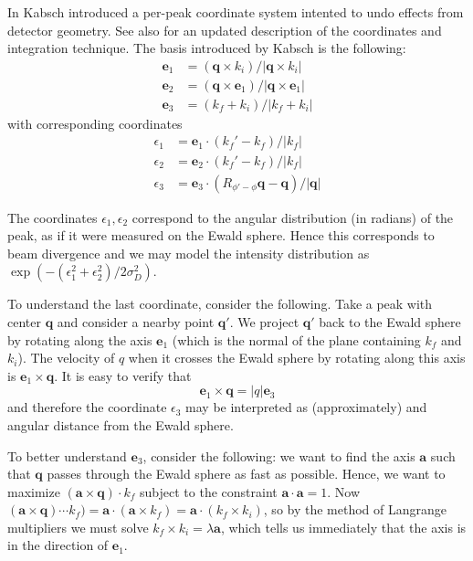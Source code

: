\documentclass[11pt,a4paper]{article}
\newcommand{\ba}{\mathbf{a}}
\newcommand{\be}{\mathbf{e}}
\newcommand{\bq}{\mathbf{q}}
\begin{document}
In \cite{Kab88} Kabsch introduced a per-peak coordinate system intented to undo effects from detector geometry.
See also \cite{Kab10b} for an updated description of the coordinates and integration technique.
The basis introduced by Kabsch is the following:
\begin{align}
  \be_1 &= (\bq \times k_i) / |\bq \times k_i| \\
  \be_2 &= (\bq \times \be_1) / |\bq \times \be_1| \\
  \be_3 &= (k_f + k_i) / |k_f + k_i|
\end{align}
with corresponding coordinates
\begin{align}
  \epsilon_1 &= \be_1 \cdot (k_f'-k_f) / |k_f| \\
  \epsilon_2 &= \be_2 \cdot (k_f'-k_f) / |k_f| \\
  \epsilon_3 &= \be_3 \cdot (R_{\phi'-\phi}\bq-\bq) / |\bq|
\end{align}

The coordinates $\epsilon_1, \epsilon_2$ correspond to the angular distribution (in radians) of the peak, as if it were measured on the Ewald sphere. Hence this corresponds to beam divergence and we may model the intensity distribution as $\exp(-(\epsilon_1^2 + \epsilon_2^2)/2 \sigma_D^2)$.

To understand the last coordinate, consider the following. Take a peak with center $\bq$ and consider a nearby point $\bq'$. We project $\bq'$ back to the Ewald sphere by rotating along the axis $\be_1$ (which is the normal of the plane containing $k_f$ and $k_i$). The velocity of $q$ when it crosses the Ewald sphere by rotating along this axis is $\be_1 \times \bq$. It is easy to verify that
\begin{equation} \be_1 \times \bq = |q| \be_3 \end{equation}
and therefore the coordinate $\epsilon_3$ may be interpreted as (approximately) and angular distance from the Ewald sphere.

To better understand $\be_3$, consider the following: we want to find the axis $\ba$ such that $\bq$ passes through the Ewald sphere as fast as possible. Hence, we want to maximize $(\ba \times \bq) \cdot k_f$ subject to the constraint $\ba \cdot \ba = 1$.
Now $(\ba \times \bq) \cdots k_f) = \ba \cdot (\ba \times k_f) = \ba \cdot (k_f \times k_i)$, so by the method of Langrange multipliers we must solve $k_f \times k_i = \lambda \ba$, which tells us immediately that the axis is in the direction of $\be_1$.


\end{document}
